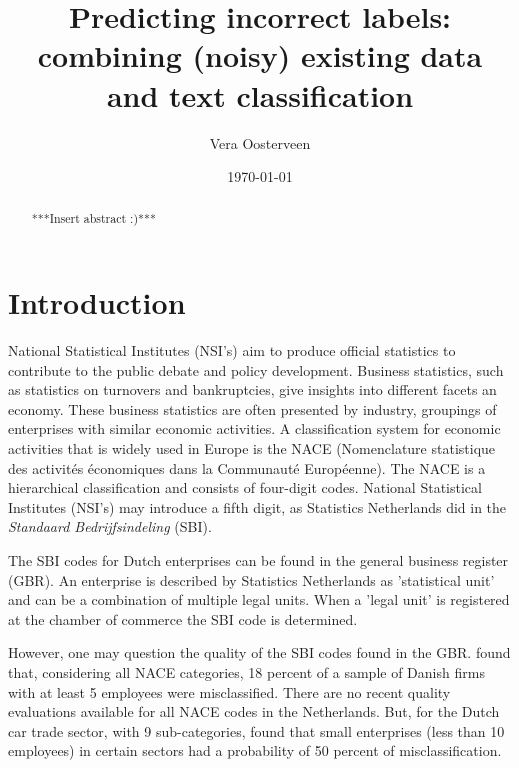 \documentclass[12pt, a4paper, titlepage]{article}
\begin{document}
\title{Predicting incorrect labels: combining (noisy) existing data and text classification}
\author{Vera Oosterveen \\   }
\date{\today}
\maketitle

							\begin{abstract}
							***Insert abstract :)***
							\end{abstract}


							\section{Introduction}
							\label{section:intro}

National Statistical Institutes (NSI’s) aim to produce official statistics to contribute to the public debate and policy development. Business statistics, such as statistics on turnovers and bankruptcies, give insights into different facets an economy. These business statistics are often presented by industry, groupings of enterprises with similar economic activities. A classification system for economic activities that is widely used in Europe is the NACE (Nomenclature statistique des activités économiques dans la Communauté Européenne). The NACE is a hierarchical classification and consists of four-digit codes. National Statistical Institutes (NSI’s) may introduce a fifth digit, as Statistics Netherlands did in the \textit{Standaard Bedrijfsindeling} (SBI).

The SBI codes for Dutch enterprises can be found in the general business register (GBR). An enterprise is described by Statistics Netherlands as 'statistical unit' and can be a combination of multiple legal units. When a 'legal unit' is registered at the chamber of commerce the SBI code is determined. 

However, one may question the quality of the SBI codes found in the GBR. \citet{Christensen2008} found that, considering all NACE categories, 18 percent of a sample of Danish firms with at least 5 employees were misclassified. There are no recent quality evaluations available for all NACE codes in the Netherlands. But, for the Dutch car trade sector, with 9 sub-categories, \citet{DeldenScholtusBurger} found that small enterprises (less than 10 employees) in certain sectors had a probability of 50 percent of misclassification.
\end{document}
